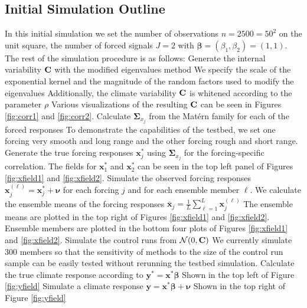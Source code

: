 \documentclass[12pt]{article}
\newcommand{\C}{\ensuremath{\text{Cov}}}
\def\*#1{\bm{#1}}
\def\C{\textbf{\text{C}}}
\begin{document}
\clearpage
\subsection{Initial Simulation Outline}

\begin{outline}[enumerate]
In this initial simulation we set the number of observations $n = 2500 = 50^2$ on the unit square, the number of forced signals $J =2$ with $\*\beta = (\beta_1, \beta_2) = (1,1)$. The rest of the simulation procedure is as follows:
\1 Generate the internal variability $\C$ with the modified eigenvalues method
\2 We specify the scale of the exponential kernel and the magnitude of the random factors used to modify the eigenvalues
\2 Additionally, the climate variability $\C$ is whitened according to the parameter $\rho$
\2 Various visualizations of the resulting $\C$ can be seen in Figures \ref{fig:corr1} and \ref{fig:corr2}.
\1 Calculate $\*\Sigma_{x_j}$ from the Mat\'ern family for each of the forced responses
\2 To demonstrate the capabilities of the testbed, we set one forcing very smooth and long range and the other forcing rough and short range.
\1 Generate the true forcing responses $\*x^*_j$ using $\*\Sigma_{x_j}$ for the forcing-specific correlation.
\2 The fields for $\*x^*_1$ and $\*x^*_2$ can be seen in the top left panel of Figures \ref{fig:xfield1} and \ref{fig:xfield2}.
\1 Simulate the observed forcing responses $\*x^{(\ell)}_j = \*x^*_j + \*\nu$ for each forcing $j$ and for each ensemble member $\ell$. 
\2 We calculate the ensemble means of the forcing responses $\*{\bar x}_j = \frac{1}{L}\sum_{\ell =1}^L \*x^{(\ell)}_j$
\2 The ensemble means are plotted in the top right of Figures \ref{fig:xfield1} and \ref{fig:xfield2}.
\2 Ensemble members are plotted in the bottom four plots of Figures \ref{fig:xfield1} and \ref{fig:xfield2}.
\1 Simulate the control runs from $\mathcal{N}(0,\C)$ 
\2 We currently simulate 300 members so that the sensitivity of methods to the size of the control run sample can be easily tested without rerunning the testbed simulation.
\1 Calculate the true climate response according to $\*y^* = \*x^* \*\beta $ 
\2 Shown in the top left of Figure \ref{fig:yfield}
\1 Simulate a climate response $\*y = \*x^* \*\beta + \*\nu$
\2 Shown in the top right of Figure \ref{fig:yfield}

\end{outline}
\end{document}
